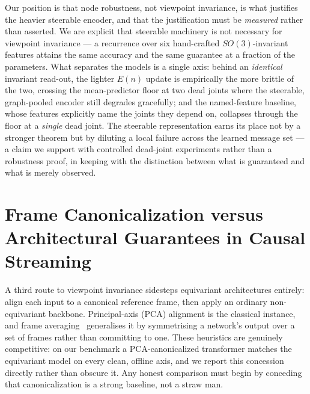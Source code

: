\documentclass[11pt]{article}
\begin{document}
Our position is that node robustness, not viewpoint invariance, is what justifies the heavier steerable
encoder, and that the justification must be \emph{measured} rather than asserted. We are explicit that
steerable machinery is not necessary for viewpoint invariance --- a recurrence over six hand-crafted
$SO(3)$-invariant features attains the same accuracy and the same guarantee at a fraction of the
parameters. What separates the models is a single axis: behind an \emph{identical} invariant read-out,
the lighter $E(n)$ update is empirically the more brittle of the two, crossing the mean-predictor floor
at two dead joints where the steerable, graph-pooled encoder still degrades gracefully; and the
named-feature baseline, whose features explicitly name the joints they depend on, collapses through the
floor at a \emph{single} dead joint. The steerable representation earns its place not by a stronger
theorem but by diluting a local failure across the learned message set --- a claim we support with
controlled dead-joint experiments rather than a robustness proof, in keeping with the distinction between
what is guaranteed and what is merely observed.

\section{Frame Canonicalization versus Architectural Guarantees in Causal Streaming}
A third route to viewpoint invariance sidesteps equivariant architectures entirely: align each input to
a canonical reference frame, then apply an ordinary non-equivariant backbone. Principal-axis (PCA)
alignment is the classical instance, and frame averaging~\cite{puny2022frameaveraging} generalises it by
symmetrising a network's output over a set of frames rather than committing to one. These heuristics are
genuinely competitive: on our benchmark a PCA-canonicalized transformer matches the equivariant model on
every clean, offline axis, and we report this concession directly rather than obscure it. Any honest
comparison must begin by conceding that canonicalization is a strong baseline, not a straw man.
\end{document}
